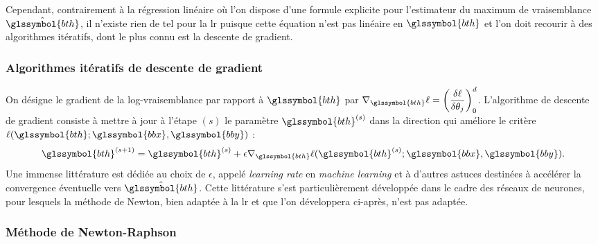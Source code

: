 Cependant, contrairement à la régression linéaire où l'on dispose d'une formule explicite pour l'estimateur du maximum de vraisemblance $\hat{\glssymbol{bth}}$, il n'existe rien de tel pour la \gls{lr} puisque cette équation n'est pas linéaire en $\glssymbol{bth}$ et l'on doit recourir à des algorithmes itératifs, dont le plus connu est la descente de gradient.

\subsubsection{Algorithmes itératifs de descente de gradient}

On désigne le gradient de la log-vraisemblance par rapport à $\glssymbol{bth}$ par $\nabla_{\glssymbol{bth}} \ell = \left( \dfrac{\delta \ell}{\delta \theta_j} \right)_0^d$. L'algorithme de descente de gradient consiste à mettre à jour à l'étape $(s)$ le paramètre $\glssymbol{bth}^{(s)}$ dans la direction qui améliore le critère $\ell(\glssymbol{bth};\glssymbol{bbx},\glssymbol{bby})$ : $$\glssymbol{bth}^{(s+1)} = \glssymbol{bth}^{(s)} + \epsilon \nabla_{\glssymbol{bth}} \ell(\glssymbol{bth}^{(s)};\glssymbol{bbx},\glssymbol{bby}).$$ Une immense littérature est dédiée au choix de $\epsilon$, appelé \textit{learning rate} en \textit{machine learning} et à d'autres astuces destinées à accélérer la convergence éventuelle vers $\hat{\glssymbol{bth}}$. Cette littérature s'est particulièrement développée dans le cadre des réseaux de neurones, pour lesquels la méthode de Newton, bien adaptée à la \gls{lr} et que l'on développera ci-après, n'est pas adaptée.

\subsubsection{Méthode de Newton-Raphson}

